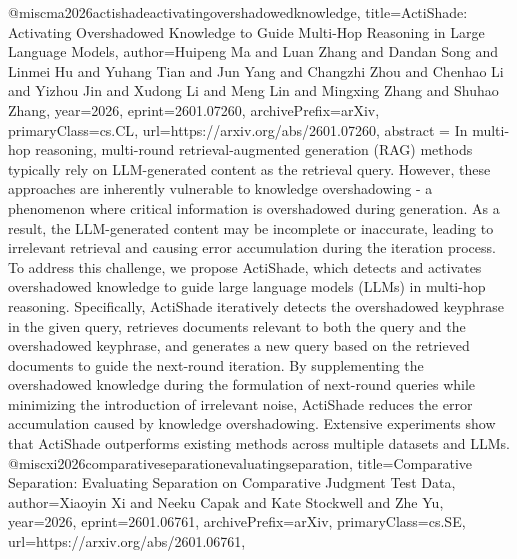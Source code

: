 {}@misc{ma2026actishadeactivatingovershadowedknowledge,
      title={ActiShade: Activating Overshadowed Knowledge to Guide Multi-Hop Reasoning in Large Language Models}, 
      author={Huipeng Ma and Luan Zhang and Dandan Song and Linmei Hu and Yuhang Tian and Jun Yang and Changzhi Zhou and Chenhao Li and Yizhou Jin and Xudong Li and Meng Lin and Mingxing Zhang and Shuhao Zhang},
      year={2026},
      eprint={2601.07260},
      archivePrefix={arXiv},
      primaryClass={cs.CL},
      url={https://arxiv.org/abs/2601.07260},
      abstract = {In multi-hop reasoning, multi-round retrieval-augmented generation (RAG) methods typically rely on LLM-generated content as the retrieval query. However, these approaches are inherently vulnerable to knowledge overshadowing - a phenomenon where critical information is overshadowed during generation. As a result, the LLM-generated content may be incomplete or inaccurate, leading to irrelevant retrieval and causing error accumulation during the iteration process. To address this challenge, we propose ActiShade, which detects and activates overshadowed knowledge to guide large language models (LLMs) in multi-hop reasoning. Specifically, ActiShade iteratively detects the overshadowed keyphrase in the given query, retrieves documents relevant to both the query and the overshadowed keyphrase, and generates a new query based on the retrieved documents to guide the next-round iteration. By supplementing the overshadowed knowledge during the formulation of next-round queries while minimizing the introduction of irrelevant noise, ActiShade reduces the error accumulation caused by knowledge overshadowing. Extensive experiments show that ActiShade outperforms existing methods across multiple datasets and LLMs.}
}@misc{xi2026comparativeseparationevaluatingseparation,
      title={Comparative Separation: Evaluating Separation on Comparative Judgment Test Data}, 
      author={Xiaoyin Xi and Neeku Capak and Kate Stockwell and Zhe Yu},
      year={2026},
      eprint={2601.06761},
      archivePrefix={arXiv},
      primaryClass={cs.SE},
      url={https://arxiv.org/abs/2601.06761},
}
